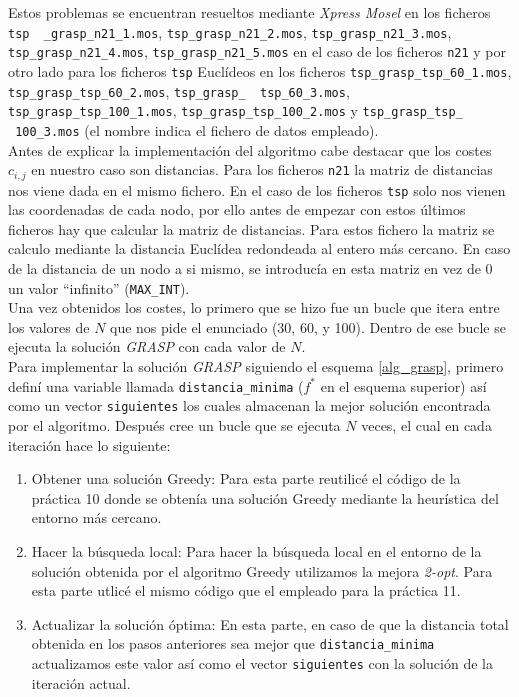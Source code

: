 \documentclass[a4paper,11pt]{article}
\begin{document}
Estos problemas se encuentran resueltos mediante \textit{Xpress Mosel} en los ficheros \texttt{tsp \ \_grasp\_n21\_1.mos}, \texttt{tsp\_grasp\_n21\_2.mos}, \texttt{tsp\_grasp\_n21\_3.mos}, \texttt{tsp\_grasp\_n21\_4.mos}, \texttt{tsp\_grasp\_n21\_5.mos} en el caso de los ficheros \texttt{n21} y por otro lado para los ficheros \texttt{tsp} Euclídeos en los ficheros \texttt{tsp\_grasp\_tsp\_60\_1.mos}, \texttt{tsp\_grasp\_tsp\_60\_2.mos}, \texttt{tsp\_grasp\_ \ tsp\_60\_3.mos}, \texttt{tsp\_grasp\_tsp\_100\_1.mos}, \texttt{tsp\_grasp\_tsp\_100\_2.mos} y \texttt{tsp\_grasp\_tsp\_ \ 100\_3.mos} (el nombre indica el fichero de datos empleado).\\

Antes de explicar la implementación del algoritmo cabe destacar que los costes ${c_{i,j}}$ en nuestro caso son distancias. Para los ficheros \texttt{n21} la matriz de distancias nos viene dada en el mismo fichero. En el caso de los ficheros \texttt{tsp} solo nos vienen las coordenadas de cada nodo, por ello antes de empezar con estos últimos ficheros hay que calcular la matriz de distancias. Para estos fichero la matriz se calculo mediante la distancia Euclídea redondeada al entero más cercano. En caso de la distancia de un nodo a si mismo, se introducía en esta matriz en vez de 0 un valor ``infinito'' (\texttt{MAX\_INT}).\\

Una vez obtenidos los costes, lo primero que se hizo fue un bucle que itera entre los valores de ${N}$ que nos pide el enunciado (30, 60, y 100). Dentro de ese bucle se ejecuta la solución \textit{GRASP} con cada valor de ${N}$.\\

Para implementar la solución \textit{GRASP} siguiendo el esquema \ref{alg_grasp}, primero definí una variable llamada \texttt{distancia\_minima} (${f^{\ast}}$ en el esquema superior) así como un vector \texttt{siguientes} los cuales almacenan la mejor solución encontrada por el algoritmo. Después cree un bucle que se ejecuta ${N}$ veces, el cual en cada iteración hace lo siguiente:

\begin{enumerate}
\item Obtener una solución Greedy: Para esta parte reutilicé el código de la práctica 10 donde se obtenía una solución Greedy mediante la heurística del entorno más cercano.
\item Hacer la búsqueda local: Para hacer la búsqueda local en el entorno de la solución obtenida por el algoritmo Greedy utilizamos la mejora \textit{2-opt}. Para esta parte utlicé el mismo código que el empleado para la práctica 11.
\item Actualizar la solución óptima: En esta parte, en caso de que la distancia total obtenida en los pasos anteriores sea mejor que \texttt{distancia\_minima} actualizamos este valor así como el vector \texttt{siguientes} con la solución de la iteración actual.
\end{enumerate}
\end{document}
